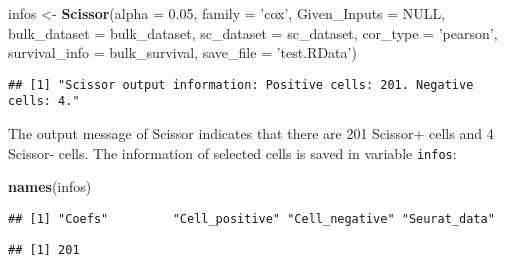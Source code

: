 \documentclass[]{article}
\newenvironment{Shaded}{\begin{snugshade}}{\end{snugshade}}
\newcommand{\KeywordTok}[1]{\textcolor[rgb]{0.13,0.29,0.53}{\textbf{#1}}}
\newcommand{\DataTypeTok}[1]{\textcolor[rgb]{0.13,0.29,0.53}{#1}}
\newcommand{\DecValTok}[1]{\textcolor[rgb]{0.00,0.00,0.81}{#1}}
\newcommand{\FloatTok}[1]{\textcolor[rgb]{0.00,0.00,0.81}{#1}}
\newcommand{\StringTok}[1]{\textcolor[rgb]{0.31,0.60,0.02}{#1}}
\newcommand{\OtherTok}[1]{\textcolor[rgb]{0.56,0.35,0.01}{#1}}
\newcommand{\OperatorTok}[1]{\textcolor[rgb]{0.81,0.36,0.00}{\textbf{#1}}}
\newcommand{\NormalTok}[1]{#1}
\begin{document}
\begin{Shaded}
\begin{Highlighting}[]
\NormalTok{infos <-}\StringTok{ }\KeywordTok{Scissor}\NormalTok{(}\DataTypeTok{alpha =} \FloatTok{0.05}\NormalTok{, }\DataTypeTok{family =} \StringTok{'cox'}\NormalTok{, }\DataTypeTok{Given_Inputs =} \OtherTok{NULL}\NormalTok{, }
                 \DataTypeTok{bulk_dataset =}\NormalTok{ bulk_dataset, }\DataTypeTok{sc_dataset =}\NormalTok{ sc_dataset, }\DataTypeTok{cor_type =} \StringTok{'pearson'}\NormalTok{,}
                 \DataTypeTok{survival_info =}\NormalTok{ bulk_survival, }\DataTypeTok{save_file =} \StringTok{'test.RData'}\NormalTok{)}
\end{Highlighting}
\end{Shaded}

\begin{verbatim}
## [1] "Scissor output information: Positive cells: 201. Negative cells: 4."
\end{verbatim}

The output message of Scissor indicates that there are 201 Scissor+
cells and 4 Scissor- cells. The information of selected cells is saved
in variable \texttt{infos}:

\begin{Shaded}
\begin{Highlighting}[]
\KeywordTok{names}\NormalTok{(infos)}
\end{Highlighting}
\end{Shaded}

\begin{verbatim}
## [1] "Coefs"         "Cell_positive" "Cell_negative" "Seurat_data"
\end{verbatim}

\begin{Shaded}
\end{Shaded}

\begin{verbatim}
## [1] 201
\end{verbatim}

\begin{Shaded}
\end{Shaded}
\end{document}
